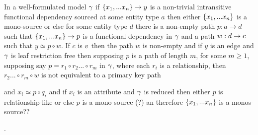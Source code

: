 \begin{lemma}
In a well-formulated model $\gamma$  if $\left\{x_1,...x_n\right\} \rightarrow y$  is a non-trivial intransitive 
functional dependency sourced at some entity type $a$ then either $\left\{x_1,...x_n\right\}$ is a mono-source
or else for some entity type $d$ there is a non-empty  path $p:a \rightarrow d$ such that $\{x_1,...x_n\} \rightarrow p$ is a functional dependency in $\gamma$
and a  path $w:d \rightarrow c$  such that $y \simeq p \circ w$. If $c$ is $v$ then
the path $w$ is non-empty and if $y$ is an edge and $\gamma$ is leaf restriction free then
supposing $p$ is a path of length $m$, for some $m \geq 1$, supposing say $ p = r_1 \circ r_2 ... \circ r_m$ 
 in $\gamma$,   where each $r_i$ is a relationship, then $r_2 ... \circ r_m \circ w$
is not equivalent to a primary key path

\begin{newtt}
and $x_i \simeq p \circ q_i$ and if $x_i$ is an attribute and $\gamma$ is reduced then either $p$ is relationship-like or else $p$ is a mono-source (?) an therefore $\left\{x_1,...x_n\right\}$ is a monos-source?? 
\end{newtt}
.
\end{lemma}
